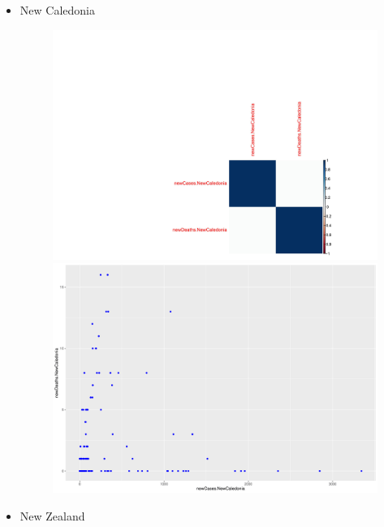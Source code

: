 \documentclass[a4paper]{article}
\theoremstyle{definition}
\begin{document}
\begin{enumerate}[i)]
\begin{enumerate}[1)]
\begin{itemize}
\end{itemize}
\begin{itemize}
    \item New Caledonia \\
     \begin{figure}[h]
      \centering
      \includegraphics[scale=0.5]{Images/CorrPlotNewCaledonia.png}
      \includegraphics[scale=0.5]{Images/PlotNewCaledonia-1.png}
     \end{figure}
\end{itemize}
\begin{itemize}
    \item New Zealand \\
     \begin{figure}[h]
      \centering

\end{figure}
\end{itemize}
\end{enumerate}
\end{enumerate}
\end{document}
